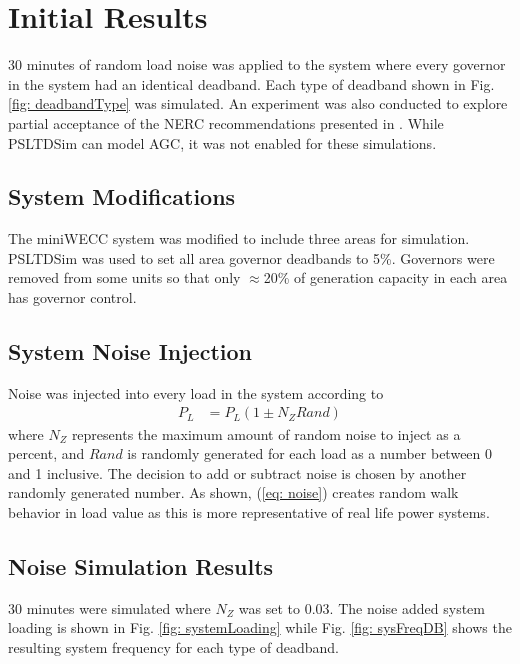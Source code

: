 \section{Initial Results}
30 minutes of random load noise was applied to the system where every governor in the system had an identical deadband.
Each type of deadband shown in Fig. \ref{fig: deadbandType} was simulated.
An experiment was also conducted to explore partial acceptance of the NERC recommendations presented in \cite{nercFRI2012}.
While PSLTDSim can model AGC, it was not enabled for these simulations.


\subsection{System Modifications}
The miniWECC system was modified to include three areas for simulation.
PSLTDSim was used to set all area governor deadbands to 5\%.
Governors were removed from some units so that only $\approx$20\% of generation capacity in each area has governor control.

\subsection{System Noise Injection}
Noise was injected into every load in the system according to
\begin{align}
P_{L} &= P_{L}(1 \pm N_Z Rand) \label{eq: noise}
\end{align}
where $N_Z$ represents the maximum amount of random noise to inject as a percent,
and $Rand$ is randomly generated for each load as a number between 0 and 1 inclusive.
The decision to add or subtract noise is chosen by another randomly generated number.
As shown, (\ref{eq: noise}) creates random walk behavior in load value as this is more representative of real life power systems\cite{AGCCresap}.


\subsection{Noise Simulation Results}
30 minutes were simulated where $N_Z$ was set to 0.03. 
The noise added system loading is shown in Fig. \ref{fig: systemLoading} while Fig. \ref{fig: sysFreqDB} shows the resulting system frequency for each type of deadband.

